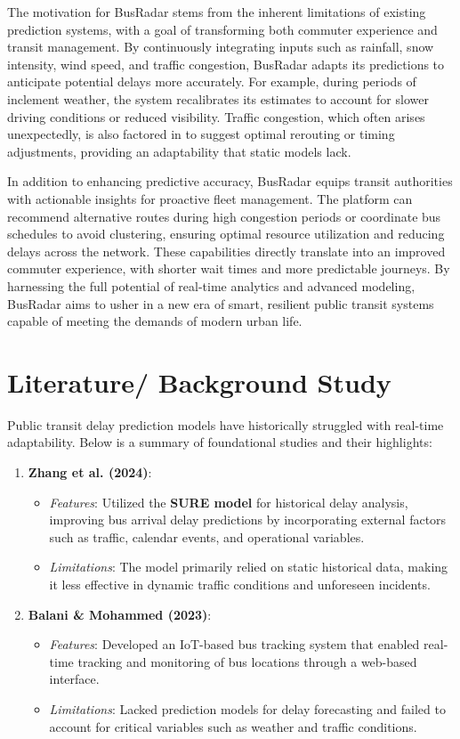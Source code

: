 \documentclass[conference]{IEEEtran}
\begin{document}
The motivation for BusRadar stems from the inherent limitations of existing prediction systems, with a goal of transforming both commuter experience and transit management. By continuously integrating inputs such as rainfall, snow intensity, wind speed, and traffic congestion, BusRadar adapts its predictions to anticipate potential delays more accurately. For example, during periods of inclement weather, the system recalibrates its estimates to account for slower driving conditions or reduced visibility. Traffic congestion, which often arises unexpectedly, is also factored in to suggest optimal rerouting or timing adjustments, providing an adaptability that static models lack.

In addition to enhancing predictive accuracy, BusRadar equips transit authorities with actionable insights for proactive fleet management. The platform can recommend alternative routes during high congestion periods or coordinate bus schedules to avoid clustering, ensuring optimal resource utilization and reducing delays across the network. These capabilities directly translate into an improved commuter experience, with shorter wait times and more predictable journeys. By harnessing the full potential of real-time analytics and advanced modeling, BusRadar aims to usher in a new era of smart, resilient public transit systems capable of meeting the demands of modern urban life.


 
\section{Literature/ Background Study}
Public transit delay prediction models have historically struggled with real-time adaptability. Below is a summary of foundational studies and their highlights:

\begin{enumerate}
    \item \textbf{Zhang et al. (2024)}:
    \begin{itemize}
        \item \textit{Features}: Utilized the \textbf{SURE model} for historical delay analysis, improving bus arrival delay predictions by incorporating external factors such as traffic, calendar events, and operational variables.
        \item \textit{Limitations}: The model primarily relied on static historical data, making it less effective in dynamic traffic conditions and unforeseen incidents.
    \end{itemize}

    \item \textbf{Balani \& Mohammed (2023)}:
    \begin{itemize}
        \item \textit{Features}: Developed an IoT-based bus tracking system that enabled real-time tracking and monitoring of bus locations through a web-based interface.
        \item \textit{Limitations}: Lacked prediction models for delay forecasting and failed to account for critical variables such as weather and traffic conditions.
    \end{itemize}
\end{enumerate}
\end{document}
